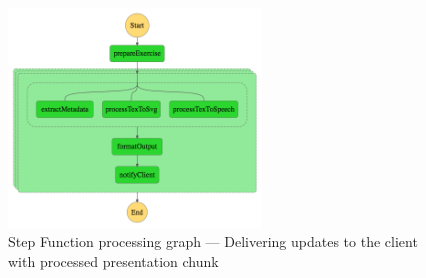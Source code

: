 \begin{figure}[H]
    \centering
    \includegraphics[width=0.6\textwidth]{assets/04-serverless-for-web-apps/stepFunctionGraphInitialBatch.png}
    \caption{Step Function processing graph --- Delivering updates to the client with processed presentation chunk}
    \label{fig:step-function-pushing-updates-to-the-client-with-partially-processed-presentation}
\end{figure}

\datasetUploadInitialBatch

